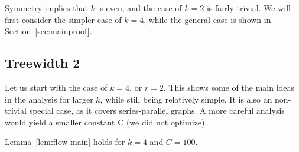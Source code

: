 Symmetry implies that $k$ is even, and the case of $k=2$ is fairly trivial. We will first consider the simpler case of $k=4$, while the general case is shown in Section~\ref{sec:mainproof}.

\subsection{Treewidth 2}
Let us start with the case of $k=4$, or $r=2$. This shows some of the main ideas in the analysis for larger $k$, while still being relatively simple. It is also an non-trivial special case, as it covers series-parallel graphs. A more careful analysis would yield a smaller constant C (we did not optimize).

\begin{lemma}\label{lem:flow-k=4} Lemma~\ref{lem:flow-main} holds for $k=4$ and $C=100$.
\end{lemma}
\ifprocs\else
